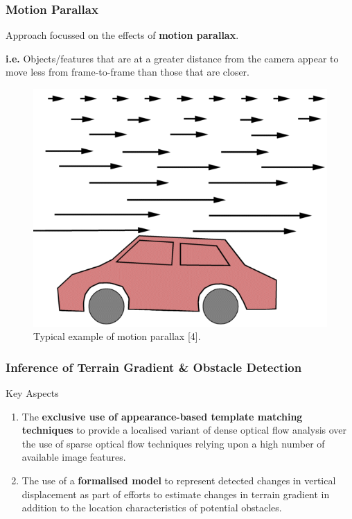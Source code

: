 \documentclass[10pt, compress]{beamer}
\begin{document}
\begin{frame}[fragile]
  \frametitle{Motion Parallax}

  Approach focussed on the effects of \textbf{motion parallax}. \\ \vspace{0.5cm}
  
  \textbf{i.e.} Objects/features that are at a greater distance from the camera appear to  move less from frame-to-frame than those that are closer.
  
\begin{figure}[ht!]
\centering
\includegraphics[scale=0.2]{motion_parallax.png}
    \caption{Typical example of motion parallax [4].}
  \end{figure}
  
\end{frame}

\begin{frame}[fragile]
  \frametitle{Inference of Terrain Gradient \& Obstacle Detection}

  \begin{block}{Key Aspects}
   
  \begin{enumerate}[label={\arabic*.}]
  \item The \textbf{exclusive use of appearance-based template matching techniques} to provide a localised variant of dense optical flow analysis over the use of sparse optical flow techniques relying upon a high number of available image features.
  
  \vspace{10pt}
  
  \item The use of a \textbf{formalised model} to represent detected changes in vertical displacement as part of efforts to estimate changes in terrain gradient in addition to the location characteristics of potential obstacles. 
\end{enumerate}
  
 \end{block}
 
\end{frame}
\end{document}
